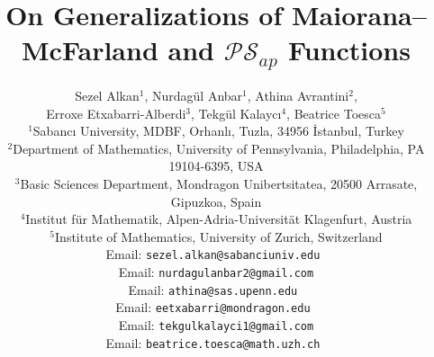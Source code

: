 \documentclass[12pt]{article}
\theoremstyle{plain}
\theoremstyle{definition}
\begin{document}
\title{On Generalizations of Maiorana--McFarland and $\mathcal{PS}_{ap}$ Functions}

\author{ 
	Sezel Alkan$^{1}$, Nurdag\"{u}l Anbar$^{1}$, Athina Avrantini$^{2}$,\\Erroxe Etxabarri-Alberdi$^{3}$, Tekg\"{u}l Kalayc\i$^{4}$, Beatrice Toesca$^{5}$
	\vspace{0.4cm} \\
	\small $^1$Sabanc{\i} University, MDBF, Orhanl\i, Tuzla, 34956 \. Istanbul, Turkey\\
	\small $^2$Department of Mathematics, University of Pennsylvania, Philadelphia, PA 19104-6395, USA
	\\
	\small $^3$Basic Sciences Department,  Mondragon Unibertsitatea, 20500 Arrasate, Gipuzkoa, Spain
	\\
	\small $^4$Institut f\"ur Mathematik, Alpen-Adria-Universit\"at Klagenfurt, Austria \\
	\small $^5$Institute of Mathematics, University of Zurich, Switzerland
	\\
	\small Email: {\tt sezel.alkan@sabanciuniv.edu } \\
	\small Email: {\tt nurdagulanbar2@gmail.com}\\
	\small Email: {\tt athina@sas.upenn.edu }\\
	\small Email: {\tt eetxabarri@mondragon.edu  } \\
	\small Email: {\tt tekgulkalayci1@gmail.com}\\
	\small Email: {\tt beatrice.toesca@math.uzh.ch  }
}
\date{}

	\maketitle
	
\end{document}
